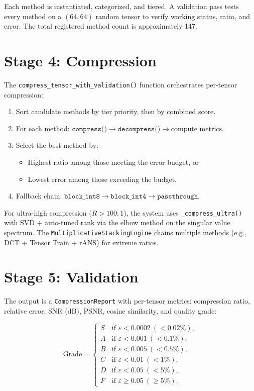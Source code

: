 \documentclass[11pt,a4paper,openright]{book}
\begin{document}
Each method is instantiated, categorized, and tiered. A validation pass tests every method on a $(64,64)$ random tensor to verify working status, ratio, and error. The total registered method count is approximately 147.

\section{Stage 4: Compression}

The \texttt{compress\_tensor\_with\_validation()} function orchestrates per-tensor compression:

\begin{enumerate}
	\item Sort candidate methods by tier priority, then by combined score.
	\item For each method: $\texttt{compress()} \to \texttt{decompress()} \to \text{compute metrics}$.
	\item Select the best method by:
	      \begin{itemize}
		      \item Highest ratio among those meeting the error budget, or
		      \item Lowest error among those exceeding the budget.
	      \end{itemize}
	\item Fallback chain: $\texttt{block\_int8} \to \texttt{block\_int4} \to \texttt{passthrough}$.
\end{enumerate}

For ultra-high compression ($R > 100:1$), the system uses \texttt{\_compress\_ultra()} with SVD + auto-tuned rank via the elbow method on the singular value spectrum. The \texttt{MultiplicativeStackingEngine} chains multiple methods (e.g., DCT + Tensor Train + rANS) for extreme ratios.

\section{Stage 5: Validation}

The output is a \texttt{CompressionReport} with per-tensor metrics: compression ratio, relative error, SNR (dB), PSNR, cosine similarity, and quality grade:

\begin{equation}
	\label{eq:grades}
	\text{Grade} =
	\begin{cases}
		S & \text{if } \varepsilon < 0.0002\ (<0.02\%), \\
		A & \text{if } \varepsilon < 0.001\ (<0.1\%),   \\
		B & \text{if } \varepsilon < 0.005\ (<0.5\%),   \\
		C & \text{if } \varepsilon < 0.01\ (<1\%),      \\
		D & \text{if } \varepsilon < 0.05\ (<5\%),      \\
		F & \text{if } \varepsilon \ge 0.05\ (\ge5\%).
	\end{cases}
\end{equation}
\end{document}
